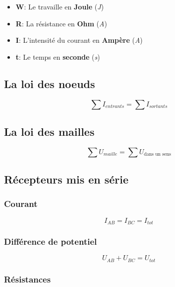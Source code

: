  \begin{itemize}
	 \item \textbf{W}: Le travaille en \textbf{Joule} (\textit{J})
	 \item \textbf{R}: La résistance en \textbf{Ohm} (\textit{A})
	 \item \textbf{I}: L'intensité du courant en \textbf{Ampère} (\textit{A})
	 \item \textbf{t}: Le temps en \textbf{seconde} (\textit{s})
 \end{itemize}

 \subsection{La loi des noeuds}

 \begin{equation}
	 \sum I_{entrants} = \sum I_{sortants}
 \end{equation}

 \subsection{La loi des mailles}

 \begin{equation}
	 \sum U_{maille} = \sum U_{\text{dans un sens}}
 \end{equation}

 \subsection{Récepteurs mis en série}
 \subsubsection{Courant}


 \begin{equation}
	 I_{AB} = I_{BC} = I_{tot}
 \end{equation}

 \subsubsection{Différence de potentiel}

 \begin{equation}
	 U_{AB} + U_{BC} = U_{tot}
 \end{equation}

 \subsubsection{Résistances}

